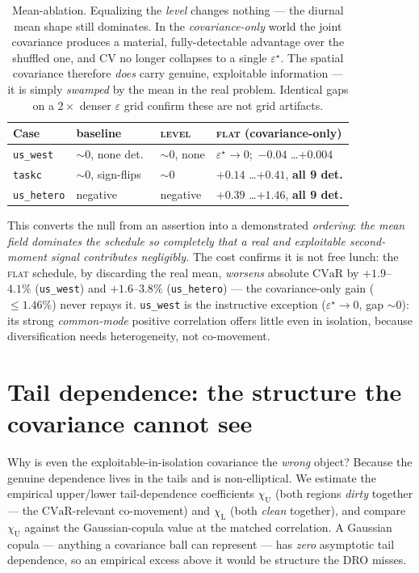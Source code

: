 \documentclass[11pt]{article}
\newcommand{\CVaR}{\mathrm{CVaR}}
\newcommand{\chiU}{\chi_{\mathrm{U}}}
\newcommand{\chiL}{\chi_{\mathrm{L}}}
\begin{document}
\begin{table}[h]\centering\small
\begin{tabular}{@{}llll@{}}
\toprule
\textbf{Case} & \textbf{baseline} & \textsc{level} & \textsc{flat} (covariance-only) \\
\midrule
\texttt{us\_west}   & $\sim 0$, none det.\ & $\sim 0$, none & $\varepsilon^\star\!\to 0$;\ $-0.04$ \dots $+0.004$ \\
\texttt{taskc}      & $\sim 0$, sign-flips & $\sim 0$ & $\mathbf{+0.14}$ \dots $\mathbf{+0.41}$, \textbf{all 9 det.} \\
\texttt{us\_hetero} & negative & negative & $\mathbf{+0.39}$ \dots $\mathbf{+1.46}$, \textbf{all 9 det.} \\
\bottomrule
\end{tabular}
\caption{Mean-ablation. Equalizing the \emph{level} changes nothing --- the diurnal
mean shape still dominates. In the \emph{covariance-only} world the joint covariance
produces a material, fully-detectable advantage over the shuffled one, and CV no longer
collapses to a single $\varepsilon^\star$. The spatial covariance therefore \emph{does}
carry genuine, exploitable information --- it is simply \emph{swamped} by the mean in
the real problem. Identical gaps on a $2\times$ denser $\varepsilon$ grid confirm these
are not grid artifacts.}
\label{tab:ablation}
\end{table}

\noindent This converts the null from an assertion into a demonstrated \emph{ordering}:
\emph{the mean field dominates the schedule so completely that a real and exploitable
second-moment signal contributes negligibly.} The cost confirms it is not free lunch:
the \textsc{flat} schedule, by discarding the real mean, \emph{worsens} absolute
$\CVaR$ by $+1.9$--$4.1\%$ (\texttt{us\_west}) and $+1.6$--$3.8\%$ (\texttt{us\_hetero})
--- the covariance-only gain ($\le 1.46\%$) never repays it. \texttt{us\_west} is the
instructive exception ($\varepsilon^\star\!\to 0$, gap $\sim 0$): its strong
\emph{common-mode} positive correlation offers little even in isolation, because
diversification needs heterogeneity, not co-movement.

\section{Tail dependence: the structure the covariance cannot see}\label{sec:tails}

Why is even the exploitable-in-isolation covariance the \emph{wrong} object? Because
the genuine dependence lives in the tails and is non-elliptical. We estimate the
empirical upper/lower tail-dependence coefficients $\chiU$ (both regions \emph{dirty}
together --- the $\CVaR$-relevant co-movement) and $\chiL$ (both \emph{clean} together),
and compare $\chiU$ against the Gaussian-copula value at the matched correlation. A
Gaussian copula --- anything a covariance ball can represent --- has \emph{zero}
asymptotic tail dependence, so an empirical excess above it would be structure the DRO
misses.
\end{document}
